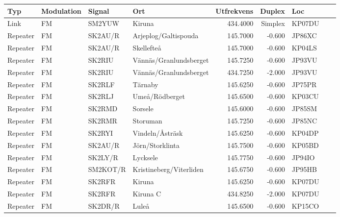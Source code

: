 \begin{longtable}{llllrrlcl}
	Typ      & Modulation         & Signal    & Ort                     & Utfrekvens &  Duplex & Loc    &  &  \\ \hline
	Link     & FM                 & SM2YUW    & Kiruna                  &   434.4000 & Simplex & KP07DU &  &  \\
	Repeater & FM                 & SK2AU/R   & Arjeplog/Galtispouda    &   145.7000 &  -0.600 & JP86XC &  &  \\
	Repeater & FM                 & SK2AU/R   & Skellefteå              &   145.7000 &  -0.600 & KP04LS &  &  \\
	Repeater & FM                 & SK2RIU    & Vännäs/Granlundsberget  &   145.7250 &  -0.600 & JP93VU &  &  \\
	Repeater & FM                 & SK2RIU    & Vännäs/Granlundsberget  &   434.7250 &  -2.000 & JP93VU &  &  \\
	Repeater & FM                 & SK2RLF    & Tärnaby                 &   145.6250 &  -0.600 & JP75PR &  &  \\
	Repeater & FM                 & SK2RLJ    & Umeå/Rödberget          &   145.6500 &  -0.600 & KP03CU &  &  \\
	Repeater & FM                 & SK2RMD    & Sorsele                 &   145.6000 &  -0.600 & JP85SM &  &  \\
	Repeater & FM                 & SK2RMR    & Storuman                &   145.7250 &  -0.600 & JP85NC &  &  \\
	Repeater & FM                 & SK2RYI    & Vindeln/Åsträsk         &   145.6250 &  -0.600 & KP04DP &  &  \\
	Repeater & FM                 & SK2AU/R   & Jörn/Storklinta         &   145.7500 &  -0.600 & KP05BD &  &  \\
	Repeater & FM                 & SK2LY/R   & Lycksele                &   145.7750 &  -0.600 & JP94IO &  &  \\
	Repeater & FM                 & SM2KOT/R  & Kristineberg/Viterliden &   145.6750 &  -0.600 & JP95HB &  &  \\
	Repeater & FM                 & SK2RFR    & Kiruna                  &   145.6250 &  -0.600 & KP07DU &  &  \\
	Repeater & FM                 & SK2RFR    & Kiruna C                &   434.8250 &  -2.000 & KP07DU &  &  \\
	Repeater & FM                 & SK2DR/R   & Luleå                   &   145.6500 &  -0.600 & KP15CO &  &  \\

\end{longtable}
